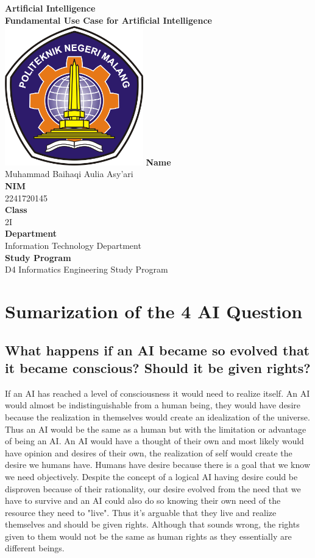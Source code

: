 \documentclass[12pt,titlepage]{article}
\newcommand{\vSubject}{Artificial Intelligence}
\newcommand{\vSubtitle}{Fundamental Use Case for Artificial Intelligence}
\newcommand{\vName}{Muhammad Baihaqi Aulia Asy'ari}
\newcommand{\vNIM}{2241720145}
\newcommand{\vClass}{2I}
\newcommand{\vDepartment}{Information Technology Department}
\newcommand{\vStudyProgram}{D4 Informatics Engineering Study Program}
\begin{document}
\begin{titlepage}
    \centering
    \vfill
    {\bfseries\LARGE
        \vSubject\\
        \vskip0.25cm
        \vSubtitle
    }
    \vfill
    \includegraphics[width=6cm]{images/polinema-logo.png}
    \vfill
    {
        \textbf{Name}\\
        \vName\\
        \vskip0.5cm
        \textbf{NIM}\\
        \vNIM\\
        \vskip0.5cm
        \textbf{Class}\\
        \vClass\\
        \vskip0.5cm
        \textbf{Department}\\
        \vDepartment\\
        \vskip0.5cm
        \textbf{Study Program}\\
        \vStudyProgram
    }
\end{titlepage}

\newpage

\section*{Sumarization of the 4 AI Question}

\subsection*{What happens if an AI became so evolved that it became conscious? Should it be given rights?}
If an AI has reached a level of consciousness it would need to realize itself. An AI would almost be indistinguishable from a human being, they would have desire because the realization in themselves would create an idealization of the universe. Thus an AI would be the same as a human but with the limitation or advantage of being an AI. An AI would have a thought of their own and most likely would have opinion and desires of their own, the realization of self would create the desire we humans have. Humans have desire because there is a goal that we know we need objectively. Despite the concept of a logical AI having desire could be disproven because of their rationality, our desire evolved from the need that we have to survive and an AI could also do so knowing their own need of the resource they need to "live". Thus it's arguable that they live and realize themselves and should be given rights. Although that sounds wrong, the rights given to them would not be the same as human rights as they essentially are different beings.
\end{document}
